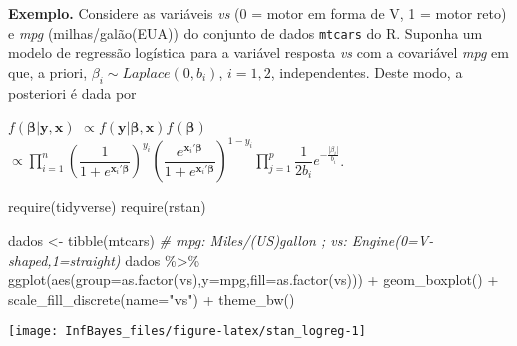 \documentclass[
]{book}
\newenvironment{Shaded}{\begin{snugshade}}{\end{snugshade}}
\newcommand{\AttributeTok}[1]{\textcolor[rgb]{0.77,0.63,0.00}{#1}}
\newcommand{\CommentTok}[1]{\textcolor[rgb]{0.56,0.35,0.01}{\textit{#1}}}
\newcommand{\FunctionTok}[1]{\textcolor[rgb]{0.00,0.00,0.00}{#1}}
\newcommand{\NormalTok}[1]{#1}
\newcommand{\OtherTok}[1]{\textcolor[rgb]{0.56,0.35,0.01}{#1}}
\newcommand{\SpecialCharTok}[1]{\textcolor[rgb]{0.00,0.00,0.00}{#1}}
\newcommand{\StringTok}[1]{\textcolor[rgb]{0.31,0.60,0.02}{#1}}
\begin{document}
\(~\)

\textbf{Exemplo.} Considere as variáveis \emph{vs} (0 = motor em forma de V, 1 = motor reto) e \emph{mpg} (milhas/galão(EUA)) do conjunto de dados \texttt{mtcars} do R. Suponha um modelo de regressão logística para a variável resposta \emph{vs} com a covariável \emph{mpg} em que, a priori, \(\beta_i \sim \textit{Laplace}(0,b_i)\), \(i=1,2\), independentes. Deste modo, a posteriori é dada por

\(f(\boldsymbol\beta | \boldsymbol{y},\boldsymbol{x})\)
\(\propto f(\boldsymbol{y}|\boldsymbol\beta,\boldsymbol{x})f(\boldsymbol\beta)\)
\(\propto \displaystyle\prod_{i=1}^{n} \left(\dfrac{1}{1+e^{\boldsymbol x_i' \boldsymbol\beta}}\right)^{y_i}\left(\dfrac{e^{\boldsymbol x_i' \boldsymbol\beta}}{1+e^{\boldsymbol x_i' \boldsymbol\beta}}\right)^{1-y_i} \prod_{j=1}^{p} \dfrac{1}{2b_i} e^{-\frac{|\beta_i|}{b_i}}\).

\begin{Shaded}
\begin{Highlighting}[]
\FunctionTok{require}\NormalTok{(tidyverse)}
\FunctionTok{require}\NormalTok{(rstan)}

\NormalTok{dados }\OtherTok{\textless{}{-}} \FunctionTok{tibble}\NormalTok{(mtcars)}
\CommentTok{\# mpg:  Miles/(US)gallon ;  vs: Engine(0=V{-}shaped,1=straight)}
\NormalTok{dados }\SpecialCharTok{\%\textgreater{}\%} \FunctionTok{ggplot}\NormalTok{(}\FunctionTok{aes}\NormalTok{(}\AttributeTok{group=}\FunctionTok{as.factor}\NormalTok{(vs),}\AttributeTok{y=}\NormalTok{mpg,}\AttributeTok{fill=}\FunctionTok{as.factor}\NormalTok{(vs))) }\SpecialCharTok{+}
        \FunctionTok{geom\_boxplot}\NormalTok{() }\SpecialCharTok{+} \FunctionTok{scale\_fill\_discrete}\NormalTok{(}\AttributeTok{name=}\StringTok{"vs"}\NormalTok{) }\SpecialCharTok{+} \FunctionTok{theme\_bw}\NormalTok{()}
\end{Highlighting}
\end{Shaded}

\begin{center}\texttt{[image: InfBayes\_files/figure-latex/stan\_logreg-1]} \end{center}
\end{document}
